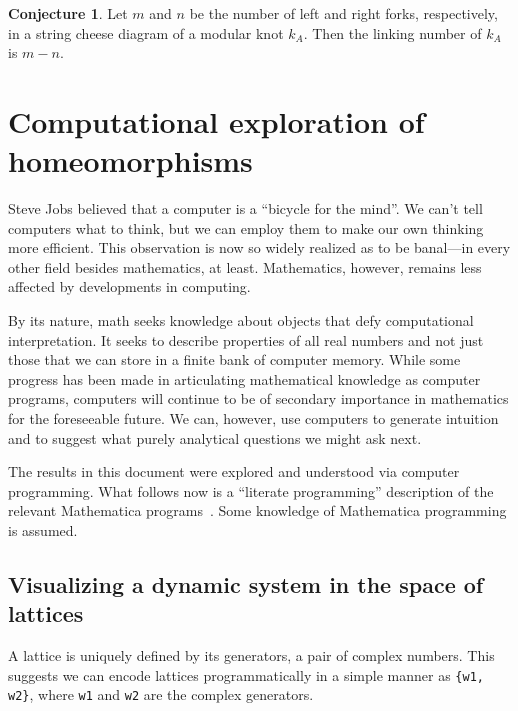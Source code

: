 \documentclass[12pt,twoside]{reedthesis}
\theoremstyle{definition}
\newtheorem{conj}[thm]{Conjecture}
\begin{document}
\begin{conj}
  Let $m$ and $n$ be the number of left and right forks, respectively, in a string cheese diagram of a modular knot $k_A$.
  Then the linking number of $k_A$ is $m - n$.
\end{conj}



\newpage
\appendix

\chapter{Computational exploration of homeomorphisms}

Steve Jobs believed that a computer is a ``bicycle for the mind''\cite{krainin1990}.
We can't tell computers what to think, but we can employ them to make our own thinking more efficient.
This observation is now so widely realized as to be banal---in every other field besides mathematics, at least.
Mathematics, however, remains less affected by developments in computing.

By its nature, math seeks knowledge about objects that defy computational interpretation.
It seeks to describe properties of all real numbers and not just those that we can store in a finite bank of computer memory.
While some progress has been made in articulating mathematical knowledge as computer programs, computers will continue to be of secondary importance in mathematics for the foreseeable future.
We can, however, use computers to generate intuition and to suggest what purely analytical questions we might ask next.

The results in this document were explored and understood via computer programming.
What follows now is a ``literate programming'' description of the relevant Mathematica programs~\cite{knuth1992}.
Some knowledge of Mathematica programming is assumed.

\newpage

\section{Visualizing a dynamic system in the space of lattices}

A lattice is uniquely defined by its generators, a pair of complex numbers.
This suggests we can encode lattices programmatically in a simple manner as \texttt{\{w1, w2\}}, where \texttt{w1} and \texttt{w2} are the complex generators. 
\end{document}
